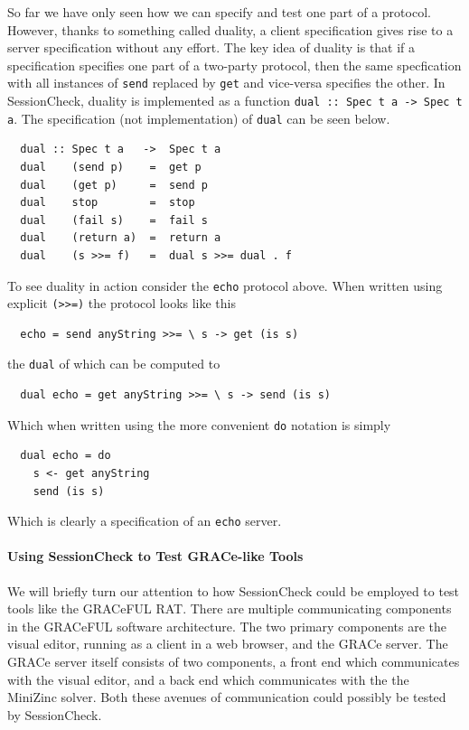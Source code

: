 \documentclass{article}
\begin{document}
So far we have only seen how we can specify and test one part of a protocol.
%
However, thanks to something called duality, a client specification gives rise
to a server specification without any effort.
%
The key idea of duality is that if a specification specifies one part
of a two-party protocol, then the same specfication with all instances
of \texttt{send} replaced by \texttt{get}
and vice-versa specifies the other.
%
In SessionCheck, duality is implemented as a function \texttt{dual :: Spec t a -> Spec t a}.
%
The specification (not implementation) of \texttt{dual} can be seen below.
%
\begin{verbatim}
  dual :: Spec t a   ->  Spec t a
  dual    (send p)    =  get p
  dual    (get p)     =  send p
  dual    stop        =  stop
  dual    (fail s)    =  fail s
  dual    (return a)  =  return a
  dual    (s >>= f)   =  dual s >>= dual . f
\end{verbatim}
%
To see duality in action consider the \texttt{echo} protocol above.
%
When written using explicit \texttt{(>>=)} the protocol looks like this
%
\begin{verbatim}
  echo = send anyString >>= \ s -> get (is s)
\end{verbatim}
%
the \texttt{dual} of which can be computed to
%
\begin{verbatim}
  dual echo = get anyString >>= \ s -> send (is s)
\end{verbatim}
%
Which when written using the more convenient \texttt{do} notation is simply
%
\begin{verbatim}
  dual echo = do
    s <- get anyString
    send (is s)
\end{verbatim}
%
Which is clearly a specification of an \texttt{echo} server.

\paragraph{Using SessionCheck to Test GRACe-like Tools}

We will briefly turn our attention to how SessionCheck could be employed
to test tools like the GRACeFUL RAT.
%
There are multiple communicating components in the GRACeFUL software architecture.
%
The two primary components are the visual editor, running as a client in a web browser,
and the GRACe server.
%
The GRACe server itself consists of two components, a front end which communicates with
the visual editor, and a back end which communicates with the the MiniZinc solver.
%
Both these avenues of communication could possibly be tested by SessionCheck.
%
\end{document}

